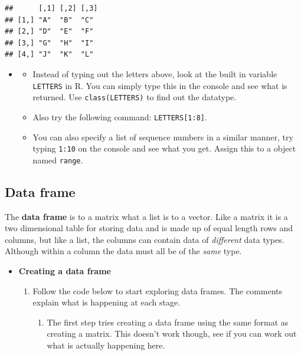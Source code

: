 \documentclass[a4paper]{book}
\providecommand{\tightlist}{%
  \setlength{\itemsep}{0pt}\setlength{\parskip}{0pt}}
\newenvironment{rmdblock}[1]
  {\vspace{1.5em}\begin{shaded*}
  \begin{itemize}
  \renewcommand{\labelitemi}{
    \raisebox{-.7\height}[0pt][0pt]{
      {\setkeys{Gin}{width=3em,keepaspectratio}\texttt{[image: images/\#1]}}
    }
  }
  \item
  }
  {
  \end{itemize}
  \end{shaded*}
  }
\newenvironment{rmdtip}
  {\begin{rmdblock}{tip}}
  {\end{rmdblock}}
\newenvironment{rmdexercise}
  {\begin{rmdblock}{exercise}}
  {\end{rmdblock}}
\begin{document}
\begin{verbatim}
##      [,1] [,2] [,3]
## [1,] "A"  "B"  "C" 
## [2,] "D"  "E"  "F" 
## [3,] "G"  "H"  "I" 
## [4,] "J"  "K"  "L"
\end{verbatim}

\begin{rmdtip}
\begin{itemize}
\item
  Instead of typing out the letters above, look at the built in variable
  \texttt{LETTERS} in R. You can simply type this in the console and see
  what is returned. Use \texttt{class(LETTERS)} to find out the
  datatype.
\item
  Also try the following command: \texttt{LETTERS{[}1:8{]}}.
\item
  You can also specify a list of sequence numbers in a similar manner,
  try typing \texttt{1:10} on the console and see what you get. Assign
  this to a object named \texttt{range}.
\end{itemize}
\end{rmdtip}

\subsection{Data frame}\label{data-frame}

The \textbf{data frame} is to a matrix what a list is to a vector. Like
a matrix it is a two dimensional table for storing data and is made up
of equal length rows and columns, but like a list, the columns can
contain data of \emph{different} data types. Although within a column
the data must all be of the \emph{same} type.

\begin{rmdexercise}
\textbf{Creating a data frame}

\begin{enumerate}
\def\labelenumi{\arabic{enumi}.}
\item
  Follow the code below to start exploring data frames. The comments
  explain what is happening at each stage.

  \begin{enumerate}
  \def\labelenumii{\alph{enumii})}
  \tightlist
  \item
    The first step tries creating a data frame using the same format as
    creating a matrix. This doesn't work though, see if you can work out
    what is actually happening here.
  \end{enumerate}
\end{enumerate}
\end{rmdexercise}
\end{document}
